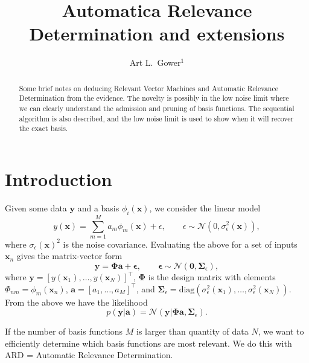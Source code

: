 \documentclass[a4paper]{article}
\title{Automatica Relevance Determination and extensions}
\date{\vspace{-5ex}}
\author{Art L.\ Gower${}^1$}
\affil{Department of Mechanical, Aerospace and Civil Engineering, \\ The University of Sheffield, UK}
\begin{document}
\maketitle

\begin{abstract}
Some brief notes on deducing Relevant Vector Machines and Automatic Relevance Determination from the evidence. The novelty is possibly in the low noise limit where we can clearly understand the admission and pruning of basis functions. The sequential algorithm is also described, and the low noise limit is used to show when it will recover the exact basis.
\end{abstract}

\section{Introduction}

Given some data $\mathbf y$ and a basis $\phi_i(\mathbf x)$, we consider the linear model
\begin{equation} \label{eq:linear_model}
    y(\mathbf x) = \sum_{m=1}^M a_m \phi_m(\mathbf x) + \epsilon, \qquad \epsilon \sim \mathcal N(0, \sigma_\epsilon^2(\mathbf x)),
\end{equation}
where ${\sigma}_\epsilon(\mathbf x)^2$ is the noise covariance. Evaluating the above for a set of inputs $\mathbf x_n$ gives the matrix-vector form
\begin{equation}
    \mathbf{y} = \mathbf{\Phi} \mathbf{a} + \boldsymbol{\epsilon}, \qquad \boldsymbol{\epsilon} \sim \mathcal{N}(\mathbf{0}, \mathbf{\Sigma}_\epsilon),
\end{equation}
where $\mathbf{y} = [y(\mathbf{x}_1), \dots, y(\mathbf{x}_N)]^\top$, $\mathbf{\Phi}$ is the design matrix with elements $\Phi_{nm} = \phi_m(\mathbf{x}_n)$, $\mathbf{a} = [a_1, \dots, a_M]^\top$, and $\mathbf{\Sigma}_\epsilon = \mathrm{diag}(\sigma_\epsilon^2(\mathbf{x}_1), \dots, \sigma_\epsilon^2(\mathbf{x}_N))$. From the above we have the likelihood
\begin{equation}
    p(\mathbf{y}|\mathbf{a}) = \mathcal{N}(\mathbf{y}|\mathbf{\Phi}\mathbf{a}, \mathbf{\Sigma}_\epsilon).
\end{equation}


If the number of basis functions $M$ is larger than quantity of data $N$, we want to efficiently determine which basis functions are most relevant. We do this with ARD = Automatic Relevance Determination.
\end{document}
